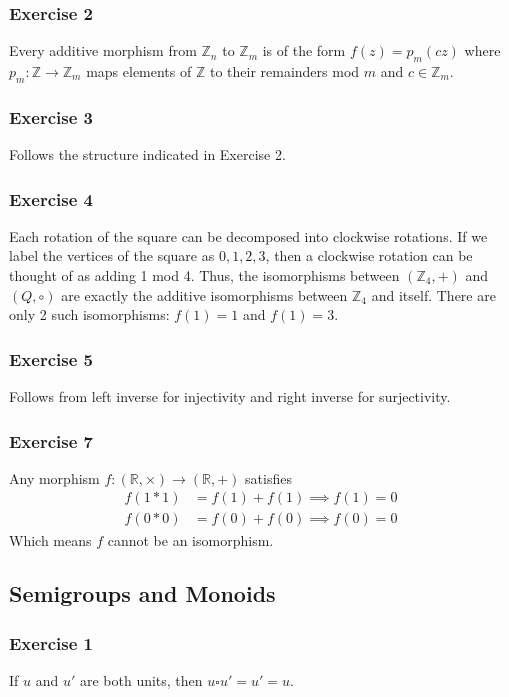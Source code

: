 \subsubsection{Exercise 2}
Every additive morphism from $\mathbb{Z}_n$ to $\mathbb{Z}_m$ is of the form $f(z) = p_m (c z)$ 
where $p_m: \mathbb{Z} \to \mathbb{Z}_m$ maps elements of $\mathbb{Z}$ to their remainders mod $m$  
and $c \in  \mathbb{Z}_m$.

\subsubsection{Exercise 3}
Follows the structure indicated in Exercise 2.

\subsubsection{Exercise 4}
Each rotation of the square can be decomposed into clockwise rotations. If we label the vertices of 
the square as $0, 1, 2, 3$, then a clockwise rotation can be thought of as adding 1 mod 4. Thus,
the isomorphisms between $(\mathbb{Z}_4, +)$ and $(Q, \circ)$ are exactly the additive isomorphisms
between $\mathbb{Z}_4$ and itself. There are only 2 such isomorphisms: $f(1) = 1$ and $f(1) = 3$.

\subsubsection{Exercise 5}
Follows from left inverse for injectivity and right inverse for surjectivity.

\subsubsection{Exercise 7}
Any morphism $f: (\mathbb{R}, \times) \to (\mathbb{R}, +)$ satisfies
\begin{align*}
        f(1 * 1) &= f(1) + f(1) \implies f(1) = 0 \\
        f(0 * 0) &= f(0) + f(0) \implies f(0) = 0
\end{align*}
Which means $f$ cannot be an isomorphism.

\subsection{Semigroups and Monoids}

\subsubsection{Exercise 1}
If $u$ and $u'$ are both units, then $u \square u' = u' = u$.

